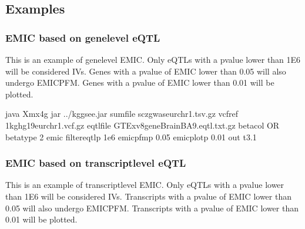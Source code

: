 \documentclass[letterpaper,10pt,english,openany,oneside]{sphinxmanual}
\begin{document}
\subsection{Examples}
\label{\detokenize{detailed_document:id7}}

\subsubsection{EMIC based on gene\sphinxhyphen{}level eQTL}
\label{\detokenize{detailed_document:emic-based-on-gene-level-eqtl}}
\sphinxAtStartPar
This is an example of gene\sphinxhyphen{}level EMIC. Only eQTLs with a p\sphinxhyphen{}value lower than 1E\sphinxhyphen{}6 will be considered IVs. Genes with a p\sphinxhyphen{}value of EMIC lower than 0.05 will also undergo EMIC\sphinxhyphen{}PFM. Genes with a p\sphinxhyphen{}value of EMIC lower than 0.01 will be plotted.

\begin{sphinxVerbatim}[commandchars=\\\{\}]
java \PYGZhy{}Xmx4g \PYGZhy{}jar ../kggsee.jar 
  \PYGZhy{}\PYGZhy{}sum\PYGZhy{}file scz\PYGZus{}gwas\PYGZus{}eur\PYGZus{}chr1.tsv.gz 
  \PYGZhy{}\PYGZhy{}vcf\PYGZhy{}ref 1kg\PYGZus{}hg19\PYGZus{}eur\PYGZus{}chr1.vcf.gz 
  \PYGZhy{}\PYGZhy{}eqtl\PYGZhy{}file GTEx\PYGZus{}v8\PYGZus{}gene\PYGZus{}BrainBA9.eqtl.txt.gz 
  \PYGZhy{}\PYGZhy{}beta\PYGZhy{}col OR 
  \PYGZhy{}\PYGZhy{}beta\PYGZhy{}type 2 
  \PYGZhy{}\PYGZhy{}emic 
  \PYGZhy{}\PYGZhy{}filter\PYGZhy{}eqtl\PYGZhy{}p 1e\PYGZhy{}6 
  \PYGZhy{}\PYGZhy{}emic\PYGZhy{}pfm\PYGZhy{}p 0.05 
  \PYGZhy{}\PYGZhy{}emic\PYGZhy{}plot\PYGZhy{}p 0.01 
  \PYGZhy{}\PYGZhy{}out t3.1
\end{sphinxVerbatim}


\subsubsection{EMIC based on transcript\sphinxhyphen{}level eQTL}
\label{\detokenize{detailed_document:emic-based-on-transcript-level-eqtl}}
\sphinxAtStartPar
This is an example of transcript\sphinxhyphen{}level EMIC. Only eQTLs with a p\sphinxhyphen{}value lower than 1E\sphinxhyphen{}6 will be considered IVs. Transcripts with a p\sphinxhyphen{}value of EMIC lower than 0.05 will also undergo EMIC\sphinxhyphen{}PFM. Transcripts with a p\sphinxhyphen{}value of EMIC lower than 0.01 will be plotted.
\end{document}

